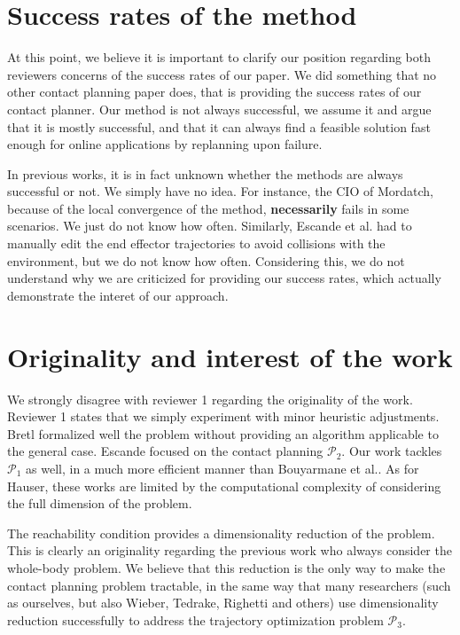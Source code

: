 \documentclass[12pt]{article}
\begin{document}
\section{Success rates of the method}
At this point, we believe it is important to clarify our position regarding both reviewers concerns of the success rates of our paper.
We did something that no other contact planning paper does, that is providing the success rates of our contact planner. Our method is not always successful, we assume it and argue that it is mostly successful, and that it can always find a feasible solution fast enough for online applications by replanning upon failure.

In previous works, it is in fact unknown whether the methods are always successful or not. We simply have no idea. For instance, the CIO of Mordatch,
because of the local convergence of the method, \textbf{necessarily} fails in some scenarios. We just do not know how often. Similarly, Escande et al. had to manually edit 
the end effector trajectories to avoid collisions with the environment, but we do not know how often. Considering this,
we do not understand why we are criticized for providing our success rates, which actually demonstrate the interet of our approach.

\section{Originality and interest of the work}
We strongly disagree with reviewer 1 regarding the originality of the work. Reviewer 1 states that we simply experiment with minor heuristic adjustments.
Bretl formalized well the problem without providing an algorithm applicable to the general case. Escande focused on the contact planning $\mathcal{P}_2$. 
Our work tackles $\mathcal{P}_1$ as well, in a much more efficient manner than Bouyarmane et al.. 
As for Hauser, these works are limited by the computational complexity of considering the full dimension of the problem.


The reachability condition provides a dimensionality reduction of the problem. This is clearly an originality regarding the previous work who always consider the whole-body problem.
We believe that this reduction is the only way to make the contact planning problem tractable, in the same way that many researchers (such as ourselves, but also Wieber, Tedrake, Righetti and others) use dimensionality reduction successfully to address
the trajectory optimization problem $\mathcal{P}_3$.
\end{document}
